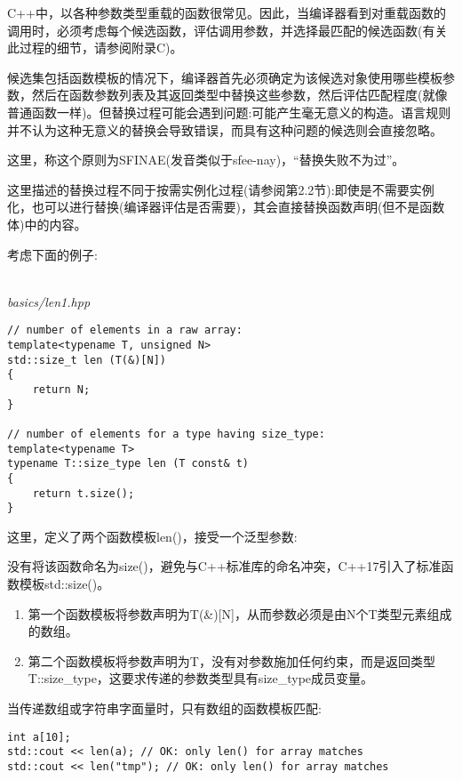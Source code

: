 
C++中，以各种参数类型重载的函数很常见。因此，当编译器看到对重载函数的调用时，必须考虑每个候选函数，评估调用参数，并选择最匹配的候选函数(有关此过程的细节，请参阅附录C)。

候选集包括函数模板的情况下，编译器首先必须确定为该候选对象使用哪些模板参数，然后在函数参数列表及其返回类型中替换这些参数，然后评估匹配程度(就像普通函数一样)。但替换过程可能会遇到问题:可能产生毫无意义的构造。语言规则并不认为这种无意义的替换会导致错误，而具有这种问题的候选则会直接忽略。

这里，称这个原则为SFINAE(发音类似于sfee-nay)，“替换失败不为过”。

这里描述的替换过程不同于按需实例化过程(请参阅第2.2节):即使是不需要实例化，也可以进行替换(编译器评估是否需要)，其会直接替换函数声明(但不是函数体)中的内容。

考虑下面的例子:

\hspace*{\fill} \\ %
\noindent
\textit{basics/len1.hpp}
\begin{lstlisting}[style=styleCXX]
// number of elements in a raw array:
template<typename T, unsigned N>
std::size_t len (T(&)[N])
{
	return N;
}

// number of elements for a type having size_type:
template<typename T>
typename T::size_type len (T const& t)
{
	return t.size();
}
\end{lstlisting}

这里，定义了两个函数模板len()，接受一个泛型参数:

\begin{tcolorbox}[colback=webgreen!5!white,colframe=webgreen!75!black]
\hspace*{0.75cm}没有将该函数命名为size()，避免与C++标准库的命名冲突，C++17引入了标准函数模板std::size()。
\end{tcolorbox}

\begin{enumerate}
\item 
第一个函数模板将参数声明为T(\&)[N]，从而参数必须是由N个T类型元素组成的数组。

\item 
第二个函数模板将参数声明为T，没有对参数施加任何约束，而是返回类型T::size\_type，这要求传递的参数类型具有size\_type成员变量。
\end{enumerate}

当传递数组或字符串字面量时，只有数组的函数模板匹配:

\begin{lstlisting}[style=styleCXX]
int a[10];
std::cout << len(a); // OK: only len() for array matches
std::cout << len("tmp"); // OK: only len() for array matches
\end{lstlisting}

